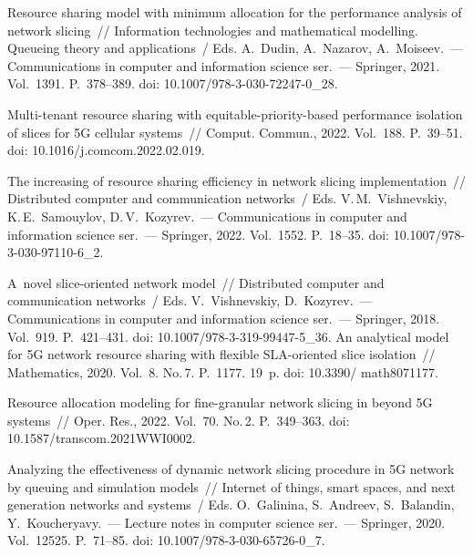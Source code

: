 \begin{multicols}{2}
\vspace*{-16pt}
  
{\small\frenchspacing
 {%
 \begin{thebibliography}{99}
 
 \vspace*{-2pt}

 Resource sharing model with minimum allocation for the 
performance analysis of network slicing~// Information technologies and mathematical 
modelling. Queueing theory and applications~/ Eds. A.~Dudin, A.~Nazarov, 
A.~Moiseev.~--- Communications in computer and information science ser.~--- Springer, 
2021. Vol.~1391. P.~378--389. doi: 10.1007/978-3-030-72247-0\_28.

 Multi-tenant 
resource sharing with equitable-priority-based performance isolation of slices for 5G cellular 
systems~// Comput. Commun., 2022. Vol.~188. P.~39--51. doi: 
10.1016/j.comcom.2022.02.019.

 The increasing of 
resource sharing efficiency in network slicing implementation~// Distributed computer and 
communication networks~/ Eds. V.\,M.~Vishnevskiy, K.\,E.~Samouylov, 
D.\,V.~Kozyrev.~--- Communications in computer and information science ser.~--- 
Springer, 2022. Vol.~1552. P.~18--35. doi: 10.1007/978-3-030-97110-6\_2.

 A~novel slice-oriented 
network model~// Distributed computer and communication networks~/ Eds. 
V.~Vishnevskiy, D.~Kozyrev.~--- Communications in computer and information 
science ser.~--- Springer, 2018. Vol.~919. P.~421--431. doi: 10.1007/978-3-319-99447-5\_36.
 An analytical model for 5G 
network resource sharing with flexible SLA-oriented slice isolation~// Mathematics, 2020. Vol.~8. 
No.\,7. P.~1177. 19~p. doi: 10.3390/ math8071177.

 Resource allocation modeling for fine-granular network slicing in 
beyond 5G systems~// Oper. Res., 2022. Vol.~70. No.\,2. P.~349--363. doi: 
10.1587/transcom.2021WWI0002.

 Analyzing the effectiveness of 
dynamic network slicing procedure in 5G network by queuing and simulation models~// {Internet 
of things, smart spaces, and next generation networks and systems}~/ Eds. 
O.~Galinina, S.~Andreev, S.~Balandin, Y.~Koucheryavy.~--- Lecture notes in 
computer science ser.~--- Springer, 2020. Vol.~12525. P.~71--85. doi: 10.1007/978-3-030-65726-0\_7.


\end{thebibliography}}}
\end{multicols}
